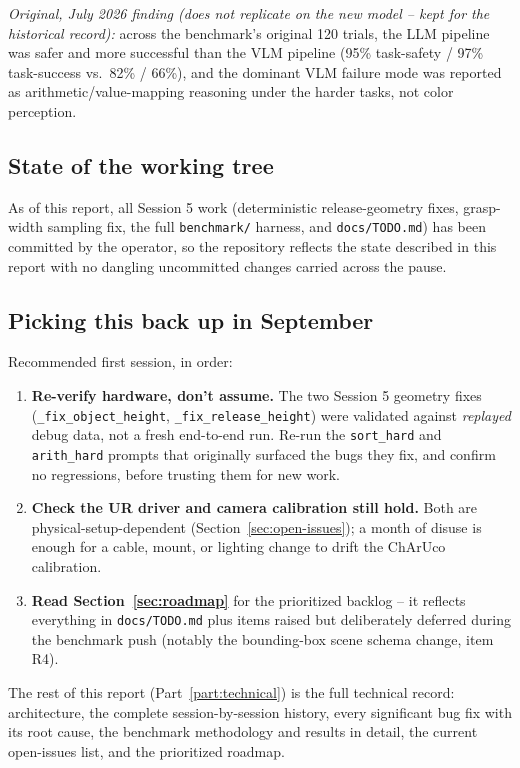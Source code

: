 \emph{Original, July 2026 finding (does not replicate on the new model --
kept for the historical record):} across the benchmark's original 120
trials, the LLM pipeline was safer and more successful than the VLM
pipeline (95\% task-safety / 97\% task-success vs.\ 82\% / 66\%), and the
dominant VLM failure mode was reported as arithmetic/value-mapping
reasoning under the harder tasks, not color perception.

\subsection*{State of the working tree}

As of this report, all Session 5 work (deterministic release-geometry fixes,
grasp-width sampling fix, the full \texttt{benchmark/} harness, and
\texttt{docs/TODO.md}) has been committed by the operator, so the repository
reflects the state described in this report with no dangling uncommitted
changes carried across the pause.

\subsection*{Picking this back up in September}

Recommended first session, in order:
\begin{enumerate}[nosep]
  \item \textbf{Re-verify hardware, don't assume.} The two Session 5
    geometry fixes (\texttt{\_fix\_object\_height},
    \texttt{\_fix\_release\_height}) were validated against \emph{replayed}
    debug data, not a fresh end-to-end run. Re-run the \texttt{sort\_hard}
    and \texttt{arith\_hard} prompts that originally surfaced the bugs they
    fix, and confirm no regressions, before trusting them for new work.
  \item \textbf{Check the UR driver and camera calibration still hold.} Both
    are physical-setup-dependent (Section~\ref{sec:open-issues}); a month of
    disuse is enough for a cable, mount, or lighting change to drift the
    ChArUco calibration.
  \item \textbf{Read Section~\ref{sec:roadmap}} for the prioritized backlog --
    it reflects everything in \texttt{docs/TODO.md} plus items raised but
    deliberately deferred during the benchmark push (notably the
    bounding-box scene schema change, item R4).
\end{enumerate}

The rest of this report (Part~\ref{part:technical}) is the full technical
record: architecture, the complete session-by-session history, every
significant bug fix with its root cause, the benchmark methodology and
results in detail, the current open-issues list, and the prioritized
roadmap.
